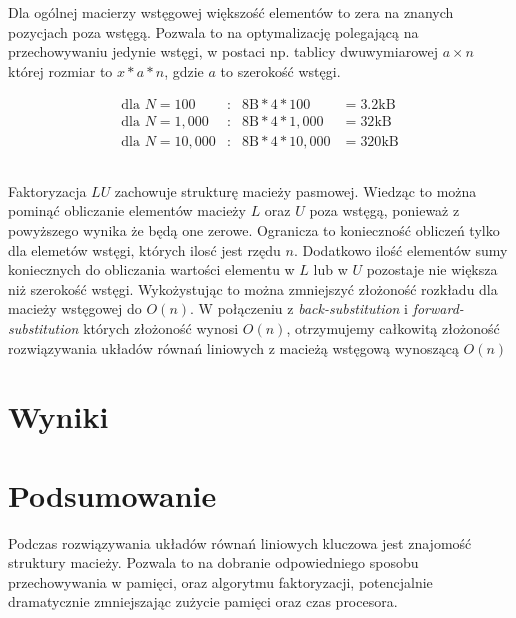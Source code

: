 \documentclass[11pt]{extarticle}
\begin{document}
	Dla ogólnej macierzy wstęgowej większość elementów to zera na znanych pozycjach poza wstęgą.
	Pozwala to na optymalizację polegającą na przechowywaniu jedynie wstęgi, 
	w postaci np. tablicy dwuwymiarowej \(a\times n\) której rozmiar to \(x*a*n\), gdzie \(a\) to szerokość wstęgi.

	\begin{align}
		\text{dla } N=100 &:& 8\text{B}*4*100 &= 3.2\text{kB} \\
		\text{dla } N=1,000 &:& 8\text{B}*4*1,000 &= 32\text{kB} \\
		\text{dla } N=10,000 &:& 8\text{B}*4*10,000 &= 320\text{kB}
	\end{align}

	\subsection{}

	Faktoryzacja \(LU\) zachowuje strukturę macieży pasmowej.
	Wiedząc to można pominąć obliczanie elementów macieży \(L\) oraz \(U\) poza wstęgą, ponieważ z powyższego wynika że będą one zerowe.
	Ogranicza to konieczność obliczeń tylko dla elemetów wstęgi, których ilosć jest rzędu \(n\).
	Dodatkowo ilość elementów sumy koniecznych do obliczania wartości elementu w \(L\) lub w \(U\) pozostaje nie większa niż szerokość wstęgi.
	Wykożystując to można zmniejszyć złożoność rozkładu dla macieży wstęgowej do \(O(n)\).
	W połączeniu z \emph{back-substitution} i \emph{forward-substitution} których złożoność wynosi \(O(n)\),
	otrzymujemy całkowitą złożoność rozwiązywania układów równań liniowych z macieżą wstęgową wynoszącą \(O(n)\)

	\pagebreak

	\section{Wyniki}
	
	\section{Podsumowanie}

	Podczas rozwiązywania układów równań liniowych kluczowa jest znajomość struktury macieży.
	Pozwala to na dobranie odpowiedniego sposobu przechowywania w pamięci, oraz algorytmu faktoryzacji,
	potencjalnie dramatycznie zmniejszając zużycie pamięci oraz czas procesora.
\end{document}
